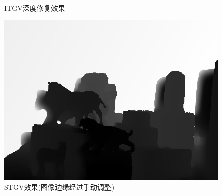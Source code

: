 \documentclass[UTF8]{ctexart}
\begin{document}
\begin{sloppypar}
\begin{figure}[htbp]
\begin{minipage}[t]{0.5\linewidth}
            \caption{ITGV深度修复效果}
            \label{fig:itgv}
        \end{minipage}
        \begin{minipage}[t]{0.5\linewidth}
            \centering
            \includegraphics[width=0.9\linewidth]{figure/tgvl2_14730_user_seg}
            \caption{STGV效果(图像边缘经过手动调整)}
            \label{fig:stgv}
        \end{minipage}
    \end{figure}\par


\end{sloppypar}
\end{document}
